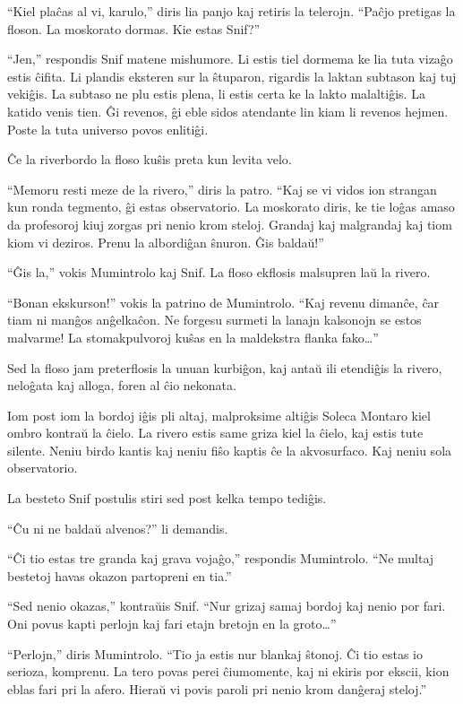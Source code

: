 ``Kiel plaĉas al vi, karulo,'' diris lia panjo kaj retiris la telerojn. ``Paĉjo pretigas la floson. La moskorato dormas. Kie estas Snif?''

``Jen,'' respondis Snif matene mishumore. Li estis tiel dormema ke lia tuta vizaĝo estis ĉifita. Li plandis eksteren sur la ŝtuparon, rigardis la laktan subtason kaj tuj vekiĝis. La subtaso ne plu estis plena, li estis certa ke la lakto malaltiĝis. La katido venis tien. Ĝi revenos, ĝi eble sidos atendante lin kiam li revenos hejmen. Poste la tuta universo povos enlitiĝi.

Ĉe la riverbordo la floso kuŝis preta kun levita velo.

``Memoru resti meze de la rivero,'' diris la patro. ``Kaj se vi vidos ion strangan kun ronda tegmento, ĝi estas observatorio. La moskorato diris, ke tie loĝas amaso da profesoroj kiuj zorgas pri nenio krom steloj. Grandaj kaj malgrandaj kaj tiom kiom vi deziros. Prenu la albordiĝan ŝnuron. Ĝis baldaŭ!''

``Ĝis la,'' vokis Mumintrolo kaj Snif. La floso ekflosis malsupren laŭ la rivero.

``Bonan ekskurson!'' vokis la patrino de Mumintrolo. ``Kaj revenu dimanĉe, ĉar tiam ni manĝos anĝelkaĉon. Ne forgesu surmeti la lanajn kalsonojn se estos malvarme! La stomakpulvoroj kuŝas en la maldekstra flanka fako{\ldots}''

Sed la floso jam preterflosis la unuan kurbiĝon, kaj antaŭ ili etendiĝis la rivero, neloĝata kaj alloga, foren al ĉio nekonata.

\sectionbreak

Iom post iom la bordoj iĝis pli altaj, malproksime altiĝis Soleca Montaro kiel ombro kontraŭ la ĉielo. La rivero estis same griza kiel la ĉielo, kaj estis tute silente. Neniu birdo kantis kaj neniu fiŝo kaptis ĉe la akvosurfaco. Kaj neniu sola observatorio.

La besteto Snif postulis stiri sed post kelka tempo tediĝis.

``Ĉu ni ne baldaŭ alvenos?'' li demandis.

``Ĉi tio estas tre granda kaj grava vojaĝo,'' respondis Mumintrolo. ``Ne multaj bestetoj havas okazon partopreni en tia.''

``Sed nenio okazas,'' kontraŭis Snif. ``Nur grizaj samaj bordoj kaj nenio por fari. Oni povus kapti perlojn kaj fari etajn bretojn en la groto{\ldots}''

``Perlojn,'' diris Mumintrolo. ``Tio ja estis nur blankaj ŝtonoj. Ĉi tio estas io serioza, komprenu. La tero povas perei ĉiumomente, kaj ni ekiris por ekscii, kion eblas fari pri la afero. Hieraŭ vi povis paroli pri nenio krom danĝeraj steloj.''

